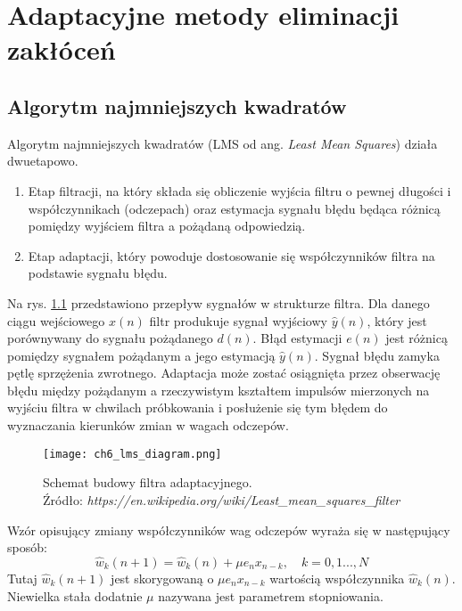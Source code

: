 \chapter{Adaptacyjne metody eliminacji zakłóceń}
\section{Algorytm najmniejszych kwadratów}
Algorytm najmniejszych kwadratów (LMS od ang. \textit{Least Mean Squares}) działa dwuetapowo.
\begin{enumerate}
\item Etap filtracji, na który składa się obliczenie wyjścia filtru o pewnej długości i współczynnikach (odczepach) oraz estymacja sygnału błędu będąca różnicą pomiędzy wyjściem filtra a pożądaną odpowiedzią.
\item Etap adaptacji, który powoduje dostosowanie się współczynników filtra na podstawie sygnału błędu.
\end{enumerate}
Na rys. \ref{lms_filter} przedstawiono przepływ sygnałów w strukturze filtra. 
Dla danego ciągu wejściowego $x(n)$ filtr produkuje sygnał wyjściowy $\hat{y}(n)$, który jest porównywany do sygnału pożądanego $d(n)$. 
Błąd estymacji $e(n)$ jest różnicą pomiędzy sygnałem pożądanym a jego estymacją $\hat{y}(n)$. 
Sygnał błędu zamyka pętlę sprzężenia zwrotnego.
Adaptacja może zostać osiągnięta przez obserwację błędu między pożądanym a rzeczywistym kształtem impulsów mierzonych na wyjściu filtra w chwilach próbkowania i posłużenie się tym błędem do wyznaczania kierunków zmian w wagach odczepów. \cite{Haykin:1996:AFT:230061}

\begin{figure}[ht]
\centering
\texttt{[image: ch6\_lms\_diagram.png]}
\caption[Schemat budowy filtra adaptacyjnego.; Źródło: \textit{https://en.wikipedia.org/wiki/Least_mean_squares_filter}]{Schemat budowy filtra adaptacyjnego. \\ Źródło: \textit{https://en.wikipedia.org/wiki/Least\_mean\_squares\_filter}\endtabular}
\label{lms_filter}
\end{figure}

Wzór opisujący zmiany współczynników wag odczepów wyraża się w następujący sposób:
\begin{equation}
\hat{w}_k(n+1) = \hat{w}_k(n) + \mu e_nx_{n-k}, \quad k= 0,1...,N
\end{equation}
Tutaj $\hat{w}_k(n+1)$ jest skorygowaną o $\mu e_nx_{n-k}$ wartością współczynnika $\hat{w}_k(n)$. 
Niewielka stała dodatnie $\mu$ nazywana jest parametrem stopniowania. \cite{Haykin:1998:ST}


